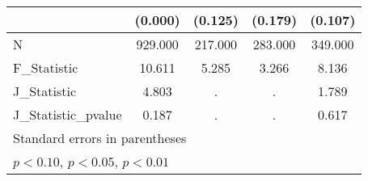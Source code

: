 {\begin{tabular}{l*{4}{c}}
            &     (0.000)         &     (0.125)         &     (0.179)         &     (0.107)         \\
\hline
N           &     929.000         &     217.000         &     283.000         &     349.000         \\
F\_Statistic &      10.611         &       5.285         &       3.266         &       8.136         \\
J\_Statistic &       4.803         &           .         &           .         &       1.789         \\
J\_Statistic\_pvalue&       0.187         &           .         &           .         &       0.617         \\
\hline\hline
\multicolumn{5}{l}{\footnotesize Standard errors in parentheses}\\
\multicolumn{5}{l}{\footnotesize \sym{*} \(p<0.10\), \sym{**} \(p<0.05\), \sym{***} \(p<0.01\)}\\
\end{tabular}
}
